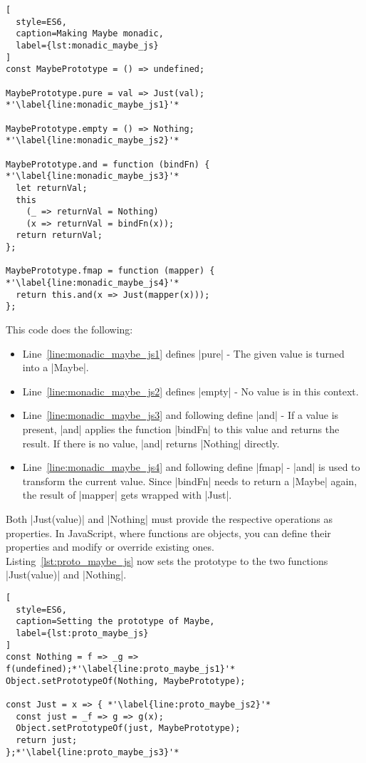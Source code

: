 \begin{lstlisting}[
  style=ES6,
  caption=Making Maybe monadic,
  label={lst:monadic_maybe_js}
]
const MaybePrototype = () => undefined;

MaybePrototype.pure = val => Just(val); *'\label{line:monadic_maybe_js1}'*

MaybePrototype.empty = () => Nothing; *'\label{line:monadic_maybe_js2}'*

MaybePrototype.and = function (bindFn) { *'\label{line:monadic_maybe_js3}'*
  let returnVal;
  this
    (_ => returnVal = Nothing)
    (x => returnVal = bindFn(x));
  return returnVal;
};

MaybePrototype.fmap = function (mapper) { *'\label{line:monadic_maybe_js4}'*
  return this.and(x => Just(mapper(x)));
};
\end{lstlisting}
This code does the following:
\begin{itemize}
  \item Line~\ref{line:monadic_maybe_js1} defines |pure| - The given value is turned
    into a |Maybe|.
  \item Line~\ref{line:monadic_maybe_js2} defines |empty| - No value is in this
    context.
  \item Line~\ref{line:monadic_maybe_js3} and following define |and| - If a
    value is present, |and| applies the function |bindFn| to this value and
    returns the result. If there is no value, |and| returns |Nothing| directly.
  \item Line~\ref{line:monadic_maybe_js4} and following define |fmap| - |and|
    is used to transform the current value. Since |bindFn| needs to return a
    |Maybe| again, the result of |mapper| gets wrapped with |Just|.
\end{itemize}

Both |Just(value)| and |Nothing| must provide the respective
operations as properties. In JavaScript, where functions are objects, you can
define their properties and modify or override existing ones. \\
Listing~\ref{lst:proto_maybe_js} now sets the prototype to the two functions
|Just(value)| and |Nothing|.

\begin{lstlisting}[
  style=ES6,
  caption=Setting the prototype of Maybe,
  label={lst:proto_maybe_js}
]
const Nothing = f => _g => f(undefined);*'\label{line:proto_maybe_js1}'*
Object.setPrototypeOf(Nothing, MaybePrototype);

const Just = x => { *'\label{line:proto_maybe_js2}'*
  const just = _f => g => g(x);
  Object.setPrototypeOf(just, MaybePrototype);
  return just;
};*'\label{line:proto_maybe_js3}'*
\end{lstlisting}

